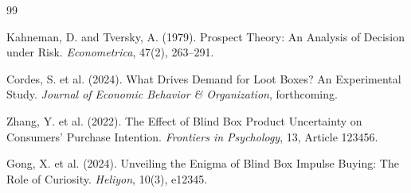 \documentclass{article}
\begin{document}
\begin{thebibliography}{99}

Kahneman, D. and Tversky, A. (1979).
Prospect Theory: An Analysis of Decision under Risk.
\emph{Econometrica}, 47(2), 263--291.


Cordes, S. et al. (2024).
What Drives Demand for Loot Boxes? An Experimental Study.
\emph{Journal of Economic Behavior \& Organization}, forthcoming.

Zhang, Y. et al. (2022).
The Effect of Blind Box Product Uncertainty on Consumers' Purchase Intention.
\emph{Frontiers in Psychology}, 13, Article 123456.

Gong, X. et al. (2024).
Unveiling the Enigma of Blind Box Impulse Buying: The Role of Curiosity.
\emph{Heliyon}, 10(3), e12345.

\end{thebibliography}
\end{document}
